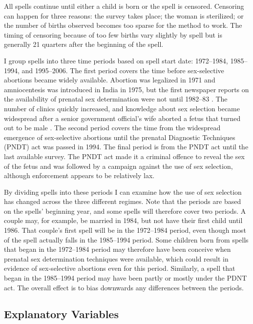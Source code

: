 \documentclass[12pt,letterpaper]{article}
\begin{document}
All spells continue until either a child is born or the spell is censored.
Censoring can happen for three reasons:
the survey takes place;
the woman is sterilized;
or the number of births observed becomes too sparse for the method to work.
The timing of censoring because of too few births vary slightly by spell but is generally 
21 quarters after the beginning of the spell.

I group spells into three time periods based on spell start date:
1972--1984, 1985--1994, and 1995--2006.
The first period covers the time before sex-selective abortions became widely available.
Abortion was legalized in 1971 and amniocentesis was introduced
in India in 1975, but the first newspaper reports on the availability of prenatal sex 
determination were not until 1982--83 \citep{Sudha1999,bhat06,Grover2006}.
The number of clinics quickly increased, and knowledge about sex selection became widespread
after a senior government official's wife aborted a fetus that turned out to be male \citep[p.\ 598]{Sudha1999}.
The second period covers the time from the widespread emergence of sex-selective abortions
until the prenatal Diagnostic Techniques (PNDT) act was passed in 1994.
The final period is from the PNDT act until the last available survey.
The PNDT act made it a criminal offence to reveal the sex of the fetus and was
followed by a campaign against the use of sex selection, although
enforcement appears to be relatively lax.

By dividing spells into these periods I can examine how the use of sex selection 
has changed across the three different regimes.
Note that the periods are based on the spells' beginning year, and some spells 
will therefore cover two periods.
A couple may, for example, be married in 1984, but not have their first child until 1986.
That couple's first spell will be in the 1972--1984 period, even though most of the 
spell actually falls in the 1985--1994 period.
Some children born from spells that began in the 1972--1984 period may therefore have been
conceive when prenatal sex determination techniques were available, which could result
in evidence of sex-selective abortions even for this period.
Similarly, a spell that began in the 1985--1994 period may have been partly or mostly
under the PDNT act.
The overall effect is to bias downwards any differences between the periods.

\subsection{Explanatory Variables}
\end{document}
